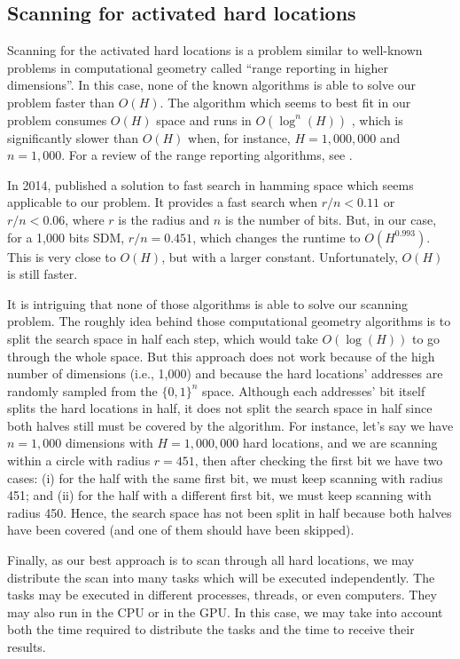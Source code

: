 \subsection{Scanning for activated hard locations}

Scanning for the activated hard locations is a problem similar to well-known problems in computational geometry called ``range reporting in higher dimensions''. In this case, none of the known algorithms is able to solve our problem faster than $O(H)$. The algorithm which seems to best fit in our problem consumes $O(H)$ space and runs in $O(\log^n(H))$ \citep{chazelle1988functional}, which is significantly slower than $O(H)$ when, for instance, $H=1,000,000$ and $n=1,000$. For a review of the range reporting algorithms, see \citet{chan2011orthogonal}.

In 2014, \citet{norouzi2014fast} published a solution to fast search in hamming space which seems applicable to our problem. It provides a fast search when $r/n < 0.11$ or $r/n < 0.06$, where $r$ is the radius and $n$ is the number of bits. But, in our case, for a 1,000 bits SDM, $r/n = 0.451$, which changes the runtime to $O(H^{0.993})$. This is very close to $O(H)$, but with a larger constant. Unfortunately, $O(H)$ is still faster.

It is intriguing that none of those algorithms is able to solve our scanning problem. The roughly idea behind those computational geometry algorithms is to split the search space in half each step, which would take $O(\log(H))$ to go through the whole space. But this approach does not work because of the high number of dimensions (i.e., 1,000) and because the hard locations' addresses are randomly sampled from the $\{0, 1\}^n$ space. Although each addresses' bit itself splits the hard locations in half, it does not split the search space in half since both halves still must be covered by the algorithm. For instance, let's say we have $n=1,000$ dimensions with $H=1,000,000$ hard locations, and we are scanning within a circle with radius $r=451$, then after checking the first bit we have two cases: (i) for the half with the same first bit, we must keep scanning with radius 451; and (ii) for the half with a different first bit, we must keep scanning with radius 450. Hence, the search space has not been split in half because both halves have been covered (and one of them should have been skipped).

Finally, as our best approach is to scan through all hard locations, we may distribute the scan into many tasks which will be executed independently. The tasks may be executed in different processes, threads, or even computers. They may also run in the CPU or in the GPU. In this case, we may take into account both the time required to distribute the tasks and the time to receive their results.

